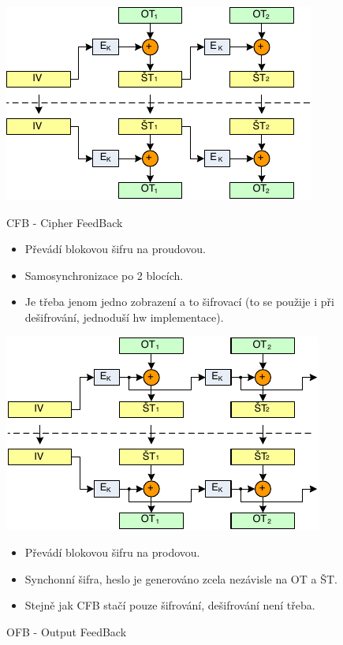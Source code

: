 \documentclass{szzclass}
\begin{document}
\begin{figure}[ht!]
\centering
\begin{minipage}{.5\textwidth}
  \centering
  \includegraphics[width=.75\linewidth]{topics/bi-spol-07/images/cfb}
  \caption{CFB - Cipher FeedBack}
  \begin{itemize}
    \item Převádí blokovou šifru na proudovou.
    \item Samosynchronizace po 2 blocích.
    \item Je třeba jenom jedno zobrazení a to šifrovací (to se použije i při dešifrování, jednoduší hw implementace).
  \end{itemize}
\end{minipage}%
\begin{minipage}{.5\textwidth}
  \centering
  \includegraphics[width=.75\linewidth]{topics/bi-spol-07/images/ofb}
  \caption{OFB - Output FeedBack}
  \begin{itemize}
    \item Převádí blokovou šifru na prodovou.
    \item Synchonní šifra, heslo je generováno zcela nezávisle na OT a ŠT.
    \item Stejně jak CFB stačí pouze šifrování, dešifrování není třeba.
  \end{itemize}
\end{minipage}
\end{figure}
\end{document}
